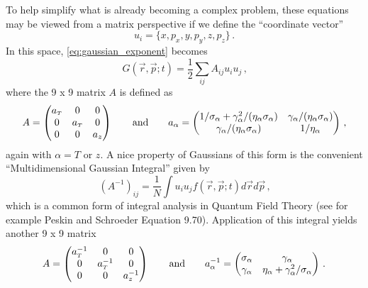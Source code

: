 To help simplify what is already becoming a complex problem, these equations may be viewed from a matrix perspective if we define the ``coordinate vector''
\begin{equation} \label{eq:coordinate_vector}
u_i = \{x, p_x, y, p_y, z, p_z\} \,\text{.}
\end{equation}
In this space, \ref{eq:gaussian_exponent} becomes
\begin{equation}
  G(\vec{r}, \vec{p}; t) = \frac{1}{2}\sum\limits_{ij} A_{ij} u_i u_j \,\text{,}
\end{equation}
where the 9 x 9 matrix $A$ is defined as
\begin{equation}
  A = 
  \begin{pmatrix}
    a_{{\scriptscriptstyle T}} & 0 & 0 \\
    0 & a_{{\scriptscriptstyle T}} & 0 \\
    0 & 0 & a_{z}
  \end{pmatrix}
  \qquad \text{and} \qquad
  a_{\alpha} = 
  \begin{pmatrix}
    1/\sigma_{\alpha} + \gamma_{\alpha}^2/(\eta_{\alpha} \sigma_{\alpha}) & \gamma_{\alpha}/(\eta_{\alpha} \sigma_{\alpha}) \\
    \gamma_{\alpha}/(\eta_{\alpha} \sigma_{\alpha}) & 1/\eta_{\alpha}
  \end{pmatrix} \,\text{,}
\end{equation}
again with $\alpha = {\scriptstyle T} \text{ or } z$. 
A nice property of Gaussians of this form is the convenient ``Multidimensional Gaussian Integral'' given by
\begin{equation} \label{eq:gaussian_integral}
  (A^{-1})_{ij} = \frac{1}{N} \int u_i u_j f(\vec{r}, \vec{p}; t) d\vec{r} d\vec{p} \,\text{,}
\end{equation}
which is a common form of integral analysis in Quantum Field Theory (see for example Peskin and Schroeder Equation 9.70). 
Application of this integral yields another 9 x 9 matrix
\begin{equation}
  A = 
  \begin{pmatrix}
    a_{{\scriptscriptstyle T}}^{-1} & 0 & 0 \\
    0 & a_{{\scriptscriptstyle T}}^{-1} & 0 \\
    0 & 0 & a_{z}^{-1}
  \end{pmatrix}
  \qquad \text{and} \qquad
  a^{-1}_{\alpha} = 
  \begin{pmatrix}
    \sigma_{\alpha} & \gamma_{\alpha} \\
    \gamma_{\alpha} & \eta_{\alpha} + \gamma_{\alpha}^2/\sigma_{\alpha}
  \end{pmatrix} \,\text{.}
\end{equation}

